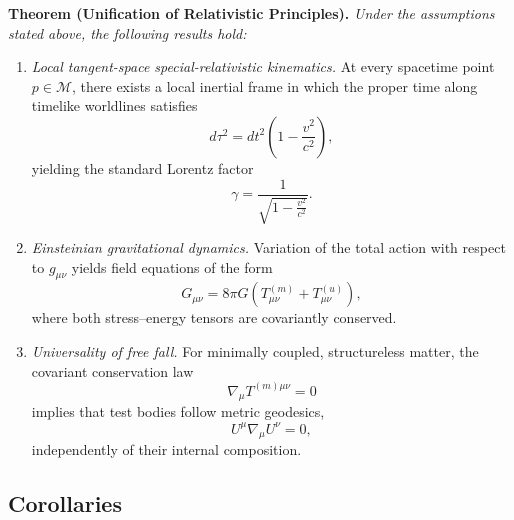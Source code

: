\documentclass[11pt]{article}
\begin{document}
            \medskip
            \noindent\textbf{Theorem (Unification of Relativistic Principles).}
            \emph{Under the assumptions stated above, the following results hold:}
            \begin{enumerate}
                \item \emph{Local tangent-space special-relativistic kinematics.}
                At every spacetime point $p\in\mathcal{M}$, there exists a local inertial
                frame in which the proper time along timelike worldlines satisfies
                \begin{equation}
                    d\tau^2 = dt^2\left(1-\frac{v^2}{c^2}\right),
                \end{equation}
                yielding the standard Lorentz factor
                \begin{equation}
                    \gamma = \frac{1}{\sqrt{1-\frac{v^2}{c^2}}}.
                \end{equation}

                \item \emph{Einsteinian gravitational dynamics.}
                Variation of the total action with respect to $g_{\mu\nu}$ yields field
                equations of the form
                \begin{equation}
                    G_{\mu\nu} = 8\pi G \left(T^{(m)}_{\mu\nu} + T^{(u)}_{\mu\nu}\right),
                \end{equation}
                where both stress--energy tensors are covariantly conserved.

                \item \emph{Universality of free fall.}
                For minimally coupled, structureless matter, the covariant conservation law
                \begin{equation}
                    \nabla_\mu T^{(m)\mu\nu} = 0
                \end{equation}
                implies that test bodies follow metric geodesics,
                \begin{equation}
                    U^\mu \nabla_\mu U^\nu = 0,
                \end{equation}
                independently of their internal composition.
            \end{enumerate}

        \subsection{Corollaries}
\end{document}
